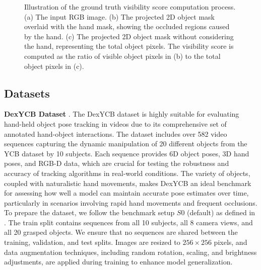 \begin{figure}[h!]
\begin{subfigure}[b]{0.32\linewidth}
        \caption{}
    \end{subfigure}
    
    \caption{Illustration of the ground truth visibility score computation process. (a) The input RGB image. (b) The projected 2D object mask overlaid with the hand mask, showing the occluded regions caused by the hand. (c) The projected 2D object mask without considering the hand, representing the total object pixels. The visibility score is computed as the ratio of visible object pixels in (b) to the total object pixels in (c).}

    \label{fig:compute_visibility_score}
\end{figure}

\subsection{Datasets}

\textbf{DexYCB Dataset} \cite{chao2021dexycb}. The DexYCB dataset is highly suitable for evaluating hand-held object pose tracking in videos due to its comprehensive set of annotated hand-object interactions. The dataset includes over 582 video sequences capturing the dynamic manipulation of 20 different objects from the YCB dataset by 10 subjects. Each sequence provides 6D object poses, 3D hand poses, and RGB-D data, which are crucial for testing the robustness and accuracy of tracking algorithms in real-world conditions. The variety of objects, coupled with naturalistic hand movements, makes DexYCB an ideal benchmark for assessing how well a model can maintain accurate pose estimates over time, particularly in scenarios involving rapid hand movements and frequent occlusions. To prepare the dataset, we follow the benchmark setup $S0$ (default) as defined in \cite{chao2021dexycb}. The train split contains sequences from all 10 subjects, all 8 camera views, and all 20 grasped objects. We ensure that no sequences are shared between the training, validation, and test splits. Images are resized to $256 \times 256$ pixels, and data augmentation techniques, including random rotation, scaling, and brightness adjustments, are applied during training to enhance model generalization. 

